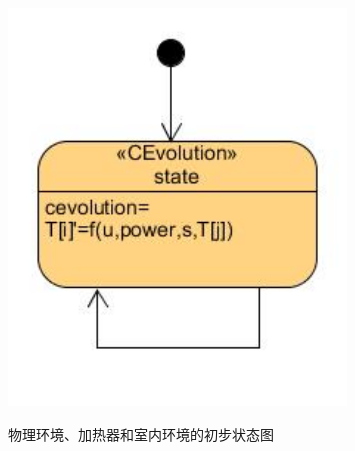 \begin{figure}[!t]
{\begin{minipage}[b]{0.3\textwidth}
	\includegraphics[width=0.8\textwidth]{room-sm1.jpg} 
	\end{minipage}
	\label{room-sm1}
	}
	\caption{物理环境、加热器和室内环境的初步状态图}
	\label{sm1}
	\end{figure}
	
